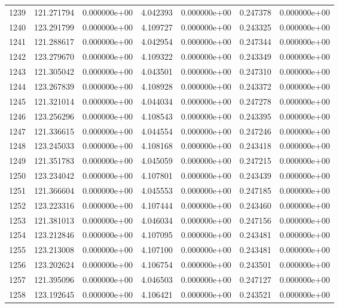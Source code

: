 \begin{tabular}{rrrrrrr}
1239 & 121.271794 &  0.000000e+00 &  4.042393 &  0.000000e+00 &    0.247378 &  0.000000e+00 \\
1240 & 123.291799 &  0.000000e+00 &  4.109727 &  0.000000e+00 &    0.243325 &  0.000000e+00 \\
1241 & 121.288617 &  0.000000e+00 &  4.042954 &  0.000000e+00 &    0.247344 &  0.000000e+00 \\
1242 & 123.279670 &  0.000000e+00 &  4.109322 &  0.000000e+00 &    0.243349 &  0.000000e+00 \\
1243 & 121.305042 &  0.000000e+00 &  4.043501 &  0.000000e+00 &    0.247310 &  0.000000e+00 \\
1244 & 123.267839 &  0.000000e+00 &  4.108928 &  0.000000e+00 &    0.243372 &  0.000000e+00 \\
1245 & 121.321014 &  0.000000e+00 &  4.044034 &  0.000000e+00 &    0.247278 &  0.000000e+00 \\
1246 & 123.256296 &  0.000000e+00 &  4.108543 &  0.000000e+00 &    0.243395 &  0.000000e+00 \\
1247 & 121.336615 &  0.000000e+00 &  4.044554 &  0.000000e+00 &    0.247246 &  0.000000e+00 \\
1248 & 123.245033 &  0.000000e+00 &  4.108168 &  0.000000e+00 &    0.243418 &  0.000000e+00 \\
1249 & 121.351783 &  0.000000e+00 &  4.045059 &  0.000000e+00 &    0.247215 &  0.000000e+00 \\
1250 & 123.234042 &  0.000000e+00 &  4.107801 &  0.000000e+00 &    0.243439 &  0.000000e+00 \\
1251 & 121.366604 &  0.000000e+00 &  4.045553 &  0.000000e+00 &    0.247185 &  0.000000e+00 \\
1252 & 123.223316 &  0.000000e+00 &  4.107444 &  0.000000e+00 &    0.243460 &  0.000000e+00 \\
1253 & 121.381013 &  0.000000e+00 &  4.046034 &  0.000000e+00 &    0.247156 &  0.000000e+00 \\
1254 & 123.212846 &  0.000000e+00 &  4.107095 &  0.000000e+00 &    0.243481 &  0.000000e+00 \\
1255 & 123.213008 &  0.000000e+00 &  4.107100 &  0.000000e+00 &    0.243481 &  0.000000e+00 \\
1256 & 123.202624 &  0.000000e+00 &  4.106754 &  0.000000e+00 &    0.243501 &  0.000000e+00 \\
1257 & 121.395096 &  0.000000e+00 &  4.046503 &  0.000000e+00 &    0.247127 &  0.000000e+00 \\
1258 & 123.192645 &  0.000000e+00 &  4.106421 &  0.000000e+00 &    0.243521 &  0.000000e+00 \\

\end{tabular}
